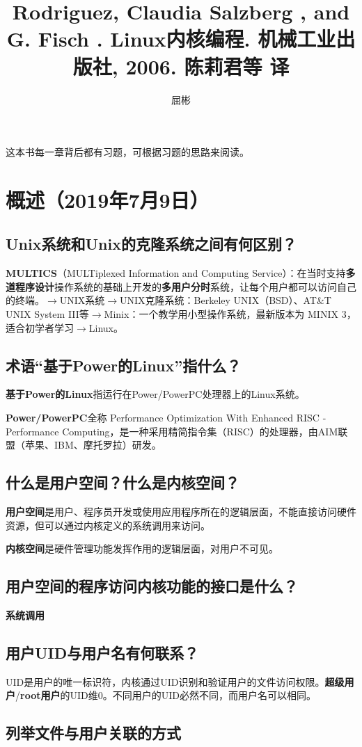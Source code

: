 \documentclass{article}
\begin{document}
	\title{Rodriguez, Claudia Salzberg , and G. Fisch . Linux内核编程. 机械工业出版社, 2006. 陈莉君等 译}
	\author{屈彬}
	\maketitle
	
	这本书每一章背后都有习题，可根据习题的思路来阅读。
	\section{概述（2019年7月9日）}
		\subsection{Unix系统和Unix的克隆系统之间有何区别？}
			\textbf{MULTICS}（MULTiplexed Information and Computing Service）：在当时支持\textbf{多道程序设计}操作系统的基础上开发的\textbf{多用户分时}系统，让每个用户都可以访问自己的终端。$\rightarrow$UNIX系统$\rightarrow$UNIX克隆系统：Berkeley UNIX（BSD）、AT\&T UNIX System III等$\rightarrow$Minix：一个教学用小型操作系统，最新版本为 MINIX 3，适合初学者学习$\rightarrow$Linux。
		\subsection{术语``基于Power的Linux''指什么？}
			\textbf{基于Power的Linux}指运行在Power/PowerPC处理器上的Linux系统。
			
			\textbf{Power/PowerPC}全称 Performance Optimization With Enhanced RISC - Performance Computing，是一种采用精简指令集（RISC）的处理器，由AIM联盟（苹果、IBM、摩托罗拉）研发。
		\subsection{什么是用户空间？什么是内核空间？}
			\textbf{用户空间}是用户、程序员开发或使用应用程序所在的逻辑层面，不能直接访问硬件资源，但可以通过内核定义的系统调用来访问。
			
			\textbf{内核空间}是硬件管理功能发挥作用的逻辑层面，对用户不可见。
		\subsection{用户空间的程序访问内核功能的接口是什么？}
			\textbf{系统调用}
		\subsection{用户UID与用户名有何联系？}
			UID是用户的唯一标识符，内核通过UID识别和验证用户的文件访问权限。\textbf{超级用户}/\textbf{root用户}的UID维0。不同用户的UID必然不同，而用户名可以相同。
		\subsection{列举文件与用户关联的方式}
			
\end{document}
